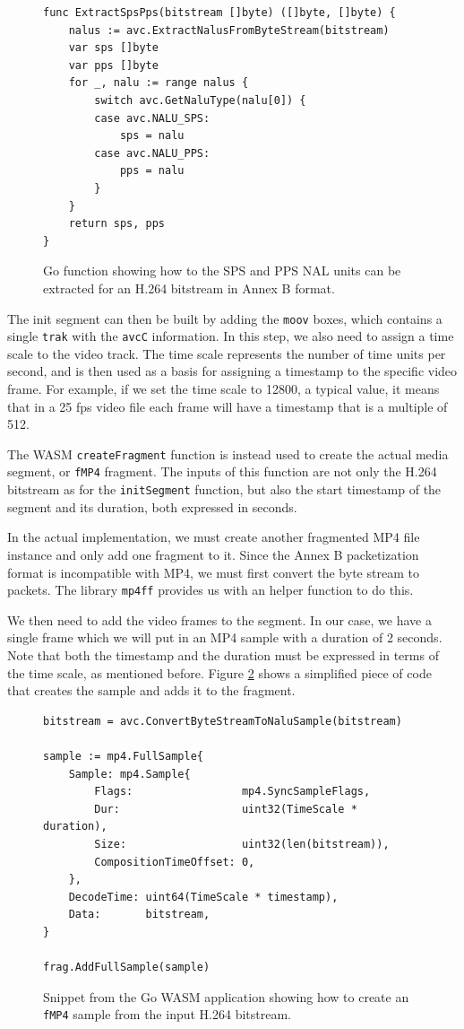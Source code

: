 \begin{figure}[h]
    \centering
    \begin{verbatim}
func ExtractSpsPps(bitstream []byte) ([]byte, []byte) {
	nalus := avc.ExtractNalusFromByteStream(bitstream)
	var sps []byte
	var pps []byte
	for _, nalu := range nalus {
		switch avc.GetNaluType(nalu[0]) {
		case avc.NALU_SPS:
			sps = nalu
		case avc.NALU_PPS:
			pps = nalu
		}
	}
	return sps, pps
}
    \end{verbatim}
    \caption{Go function showing how to the SPS and PPS NAL units can be extracted for an H.264 bitstream in Annex B format.}
    \label{fig:wasm_go_sps}
\end{figure}

The init segment can then be built by adding the \texttt{moov} boxes, which contains a single \texttt{trak} with the \texttt{avcC} information. In this step, we also need to assign a time scale to the video track. The time scale represents the number of time units per second, and is then used as a basis for assigning a timestamp to the specific video frame. For example, if we set the time scale to 12800, a typical value, it means that in a 25 fps video file each frame will have a timestamp that is a multiple of 512.

The WASM \texttt{createFragment} function is instead used to create the actual media segment, or \texttt{fMP4} fragment. The inputs of this function are not only the H.264 bitstream as for the \texttt{initSegment} function, but also the start timestamp of the segment and its duration, both expressed in seconds.

In the actual implementation, we must create another fragmented MP4 file instance and only add one fragment to it. Since the Annex B packetization format is incompatible with MP4, we must first convert the byte stream to packets. The library \texttt{mp4ff} provides us with an helper function to do this.

We then need to add the video frames to the segment. In our case, we have a single frame which we will put in an MP4 sample with a duration of 2 seconds. Note that both the timestamp and the duration must be expressed in terms of the time scale, as mentioned before. Figure \ref{fig:wasm_go_fragment} shows a simplified piece of code that creates the sample and adds it to the fragment.

\begin{figure}[h]
    \centering
    \begin{verbatim}
bitstream = avc.ConvertByteStreamToNaluSample(bitstream)

sample := mp4.FullSample{
	Sample: mp4.Sample{
		Flags:                 mp4.SyncSampleFlags,
		Dur:                   uint32(TimeScale * duration),
		Size:                  uint32(len(bitstream)),
		CompositionTimeOffset: 0,
	},
	DecodeTime: uint64(TimeScale * timestamp),
	Data:       bitstream,
}

frag.AddFullSample(sample)
    \end{verbatim}
    \caption{Snippet from the Go WASM application showing how to create an \texttt{fMP4} sample from the input H.264 bitstream.}
    \label{fig:wasm_go_fragment}
\end{figure}

